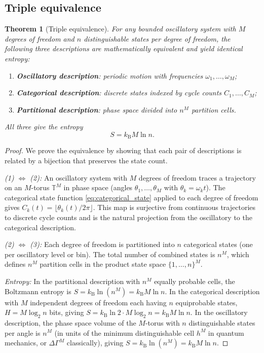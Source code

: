\documentclass[twocolumn,10pt,a4paper]{article}
\newtheorem{theorem}{Theorem}[section]
\theoremstyle{definition}
\theoremstyle{remark}
\newcommand{\kB}{k_{\mathrm{B}}}
\begin{document}
\subsection{Triple equivalence}

\begin{theorem}[Triple equivalence]\label{thm:triple_equiv}
For any bounded oscillatory system with $M$ degrees of freedom and $n$ distinguishable states per degree of freedom, the following three descriptions are mathematically equivalent and yield identical entropy:
\begin{enumerate}[label=(\arabic*)]
\item \textbf{Oscillatory description}: periodic motion with frequencies $\omega_1, \ldots, \omega_M$;
\item \textbf{Categorical description}: discrete states indexed by cycle counts $C_1, \ldots, C_M$;
\item \textbf{Partitional description}: phase space divided into $n^M$ partition cells.
\end{enumerate}
All three give the entropy
\begin{equation}\label{eq:triple_entropy}
S = \kB M \ln n.
\end{equation}
\end{theorem}

\begin{proof}
We prove the equivalence by showing that each pair of descriptions is related by a bijection that preserves the state count.

\emph{(1) $\Leftrightarrow$ (2):} An oscillatory system with $M$ degrees of freedom traces a trajectory on an $M$-torus $\mathbb{T}^M$ in phase space (angles $\theta_1, \ldots, \theta_M$ with $\theta_k = \omega_k t$). The categorical state function \eqref{eq:categorical_state} applied to each degree of freedom gives $C_k(t) = \lfloor \theta_k(t) / 2\pi \rfloor$. This map is surjective from continuous trajectories to discrete cycle counts and is the natural projection from the oscillatory to the categorical description.

\emph{(2) $\Leftrightarrow$ (3):} Each degree of freedom is partitioned into $n$ categorical states (one per oscillatory level or bin). The total number of combined states is $n^M$, which defines $n^M$ partition cells in the product state space $\{1, \ldots, n\}^M$.

\emph{Entropy:} In the partitional description with $n^M$ equally probable cells, the Boltzmann entropy is $S = \kB \ln(n^M) = \kB M \ln n$. In the categorical description with $M$ independent degrees of freedom each having $n$ equiprobable states, $H = M \log_2 n$ bits, giving $S = \kB \ln 2 \cdot M \log_2 n = \kB M \ln n$. In the oscillatory description, the phase space volume of the $M$-torus with $n$ distinguishable states per angle is $n^M$ (in units of the minimum distinguishable cell $h^M$ in quantum mechanics, or $\Delta\Gamma^M$ classically), giving $S = \kB \ln(n^M) = \kB M \ln n$.
\end{proof}
\end{document}
